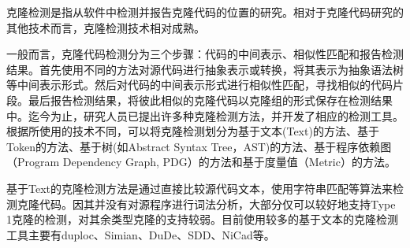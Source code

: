 
克隆检测是指从软件中检测并报告克隆代码的位置的研究。相对于克隆代码研究的其他技术而言，克隆检测技术相对成熟。


一般而言，克隆代码检测分为三个步骤：代码的中间表示、相似性匹配和报告检测结果。首先使用不同的方法对源代码进行抽象表示或转换，将其表示为抽象语法树等中间表示形式。然后对代码的中间表示形式进行相似性匹配，寻找相似的代码片段。最后报告检测结果，将彼此相似的克隆代码以克隆组的形式保存在检测结果中。迄今为止，研究人员已提出许多种克隆检测方法，并开发了相应的检测工具。根据所使用的技术不同，可以将克隆检测划分为基于文本(Text)的方法、基于Token的方法、基于树(如Abstract Syntax Tree，AST)的方法、基于程序依赖图（Program Dependency Graph, PDG）的方法和基于度量值（Metric）的方法。

基于Text的克隆检测方法是通过直接比较源代码文本，使用字符串匹配等算法来检测克隆代码。因其并没有对源程序进行词法分析，大部分仅可以较好地支持Type 1克隆的检测，对其余类型克隆的支持较弱。目前使用较多的基于文本的克隆检测工具主要有duploc\cite{ducasse1999language}、Simian\cite{Simian}、DuDe\cite{wettel2005archeology}、SDD\cite{lee2005sdd}、NiCad\cite{roy2008nicad}等。

